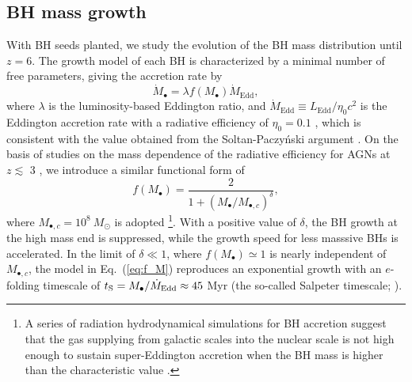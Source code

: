 \documentclass[twocolumn, twocolappendix]{aastex63}
\newcommand{\Msun}{M_\odot}
\newcommand{\Mbh}{M_\bullet}
\newcommand{\Mdot}{\dot{M}}
\begin{document}
\begin{CJK*}{UTF8}{gbsn}
\vspace{2mm}
\subsection{BH mass growth}
\label{sec:model}
With BH seeds planted, we study the evolution of the BH mass distribution until $z=6$. 
The growth model of each BH is characterized by a minimal number of free parameters, 
giving the accretion rate by
%
\begin{equation}
  \label{eq:mdot}
  \Mdot_\bullet = \lambda f(\Mbh) \Mdot_\mathrm{Edd} ,
\end{equation}
where $\lambda$ is the luminosity-based Eddington ratio,
and $\Mdot_\mathrm{Edd} \equiv L_{\mathrm{Edd}}/\eta_0 c^2$ is the Eddington accretion rate with a radiative efficiency of $\eta_0=0.1$ \citep{1973A&A....24..337S},
which is consistent with the value obtained from the Soltan-Paczy{\'n}ski argument \citep[e.g.,][]{2002MNRAS.335..965Y,2010ApJ...725..388C}.
On the basis of studies on the mass dependence of the radiative efficiency for AGNs at $z\lesssim$ 3 
\citep{2008MNRAS.390..561C,2012ApJ...749..187L,2014ApJ...786..104U}, 
we introduce a similar functional form of
%
\begin{equation}
\label{eq:f_M}
f(\Mbh) = \frac{2}{1+\left(\Mbh /M_{\bullet,c} \right)^\delta}, 
\end{equation}
%
where $M_{\bullet,c}=10^8~\Msun$ is adopted
\footnote[3]{
A series of radiation hydrodynamical simulations for BH accretion
suggest that the gas supplying from galactic scales into the nuclear scale is not high enough to sustain 
super-Eddington accretion when the BH mass is higher than the characteristic value \citep{2021ApJ...907...74T}.}.
With a positive value of $\delta$, the BH growth at the high mass end is suppressed,
while the growth speed for less masssive BHs is accelerated.
In the limit of $\delta \ll 1$, where $f(\Mbh) \simeq 1$ is nearly independent of $M_{\bullet,c}$,
the model in Eq.~(\ref{eq:f_M}) reproduces an exponential growth with an $e$-folding timescale of
$t_{\rm S} =  \Mbh/\Mdot_{\mathrm{Edd}} \approx 45$ Myr (the so-called Salpeter timescale; \citealt{1964ApJ...140..796S}).




\end{CJK*}
\end{document}
